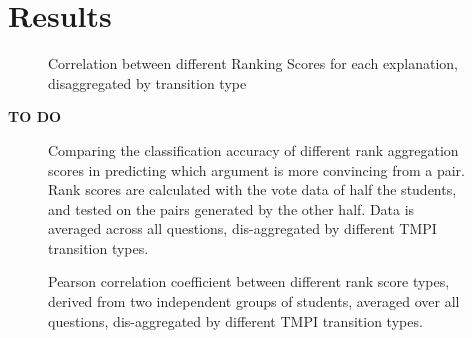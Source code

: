 \documentclass[acmsmall]{acmart}
\begin{document}
\section{Results}

\begin{figure}
	\scalebox{0.6}{}
	\caption{
		Correlation between different Ranking Scores for each explanation, 
		disaggregated by transition type  
	}
	\label{fig:acc_by_rank_score_type}
\end{figure}

\textbf{TO DO}



\begin{figure}
	\scalebox{0.6}{}
	\caption{
		Comparing the classification accuracy of different rank aggregation 
		scores in predicting which argument is more convincing from a pair. 
		Rank scores are calculated with the vote data of half the students, and 
		tested on the pairs generated by the other half. 
		Data is averaged across all questions, dis-aggregated by different TMPI 
		transition types. 
	}
	\label{fig:acc_by_rank_score_type}
\end{figure}

\begin{figure}
	\scalebox{0.6}{}
	\caption{
		Pearson correlation coefficient between different rank score types, 
		derived from two independent groups of students, averaged over all 
		questions, dis-aggregated by different TMPI transition types.
	}
	\label{fig:acc_by_rank_score_type}
\end{figure}



%	
\end{document}
